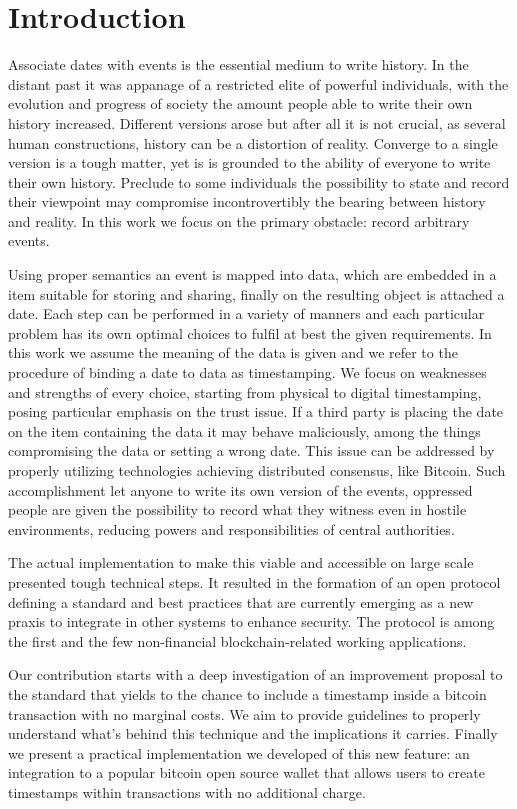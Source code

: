 \chapter{Introduction}
\label{chpr:intro}
Associate dates with events is the essential medium to write history. 
In the distant past it was appanage of a restricted elite of powerful individuals, with the evolution and progress of society the amount people able to write their own history increased.
Different versions arose but after all it is not crucial, as several human constructions, history can be a distortion of reality.
Converge to a single version is a tough matter, yet is is grounded to the ability of everyone to write their own history.
Preclude to some individuals the possibility to state and record their viewpoint may compromise incontrovertibly the bearing between history and reality.
In this work we focus on the primary obstacle: record arbitrary events.

Using proper semantics an event is mapped into data, which are embedded in a item suitable for storing and sharing, finally on the resulting object is attached a date. 
Each step can be performed in a variety of manners and each particular problem has its own optimal choices to fulfil at best the given requirements. 
In this work we assume the meaning of the data is given and we refer to the procedure of binding a date to data as timestamping. 
We focus on weaknesses and strengths of every choice, starting from physical to digital timestamping, posing particular emphasis on the trust issue.
If a third party is placing the date on the item containing the data it may behave maliciously, among the things compromising the data or setting a wrong date. This issue can be addressed by properly utilizing technologies achieving distributed consensus, like Bitcoin.
Such accomplishment let anyone to write its own version of the events, oppressed people are given the possibility to record what they witness even in hostile environments, reducing powers and responsibilities of central authorities.

The actual implementation to make this viable and accessible on large scale presented tough technical steps. 
It resulted in the formation of an open protocol defining a standard and best practices \cite{OTSWeb} that are currently emerging as a new praxis to integrate in other systems to enhance security. 
The protocol is among the first and the few non-financial blockchain-related working applications.

Our contribution starts with a deep investigation of an improvement proposal \cite{PoePR} \cite{PoeIs} to the standard that yields to the chance to include a timestamp inside a bitcoin transaction with no marginal costs. 
We aim to provide guidelines to properly understand what's behind this technique and the implications it carries.
Finally we present a practical implementation we developed of this new feature: an integration to a popular bitcoin open source wallet that allows users to create timestamps within transactions with no additional charge. 


